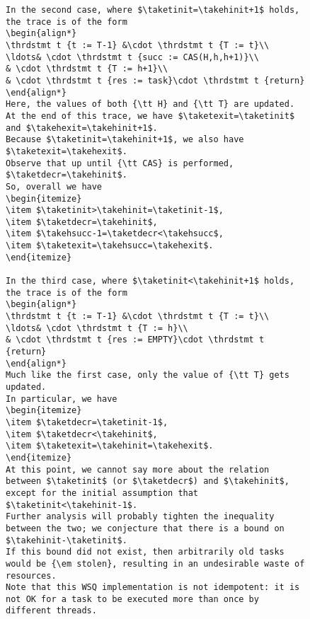 \documentclass[a4paper]{article}
\begin{document}
{\begin{figure}
\begin{lstlisting}
In the second case, where $\taketinit=\takehinit+1$ holds, the trace is of the form
\begin{align*}
\thrdstmt t {t := T-1} &\cdot \thrdstmt t {T := t}\\
\ldots& \cdot \thrdstmt t {succ := CAS(H,h,h+1)}\\
& \cdot \thrdstmt t {T := h+1}\\
& \cdot \thrdstmt t {res := task}\cdot \thrdstmt t {return}
\end{align*}
Here, the values of both {\tt H} and {\tt T} are updated.
At the end of this trace, we have $\taketexit=\taketinit$ and $\takehexit=\takehinit+1$.
Because $\taketinit=\takehinit+1$, we also have $\taketexit=\takehexit$.
Observe that up until {\tt CAS} is performed, $\taketdecr=\takehinit$.
So, overall we have 
\begin{itemize}
\item $\taketinit>\takehinit=\taketinit-1$, 
\item $\taketdecr=\takehinit$, 
\item $\takehsucc-1=\taketdecr<\takehsucc$,  
\item $\taketexit=\takehsucc=\takehexit$.
\end{itemize}

In the third case, where $\taketinit<\takehinit+1$ holds, the trace is of the form
\begin{align*}
\thrdstmt t {t := T-1} &\cdot \thrdstmt t {T := t}\\
\ldots& \cdot \thrdstmt t {T := h}\\
& \cdot \thrdstmt t {res := EMPTY}\cdot \thrdstmt t {return}
\end{align*}
Much like the first case, only the value of {\tt T} gets updated.
In particular, we have
\begin{itemize}
\item $\taketdecr=\taketinit-1$,
\item $\taketdecr<\takehinit$,
\item $\taketexit=\takehinit=\takehexit$.
\end{itemize}
At this point, we cannot say more about the relation between $\taketinit$ (or $\taketdecr$) and $\takehinit$, except for the initial assumption that $\taketinit<\takehinit-1$.
Further analysis will probably tighten the inequality between the two; we conjecture that there is a bound on $\takehinit-\taketinit$.
If this bound did not exist, then arbitrarily old tasks would be {\em stolen}, resulting in an undesirable waste of resources.
Note that this WSQ implementation is not idempotent: it is not OK for a task to be executed more than once by different threads.


\end{lstlisting}
\end{figure}}
\end{document}
